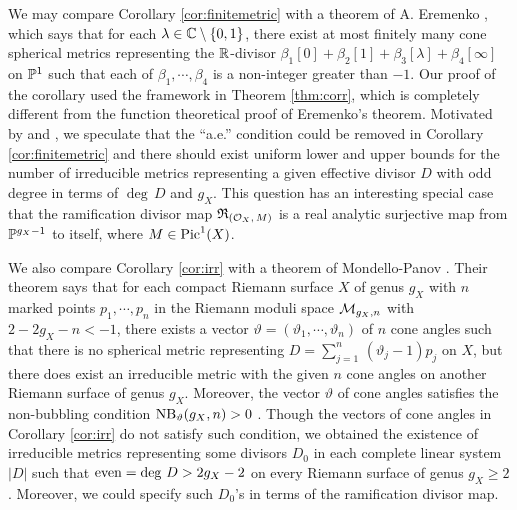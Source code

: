 \documentclass[12pt]{article}
\begin{document}
We may compare Corollary \ref{cor:finitemetric} with a theorem of A. Eremenko \cite{Er1905}, which says that for each $\lambda\in {\Bbb C} \setminus \{0,1\}$, there exist at most finitely many cone spherical metrics representing
the ${\Bbb R}$-divisor $\beta_1[0]+\beta_2[1]+\beta_3[\lambda]+\beta_4[\infty]$
on ${\Bbb P}^1$ such that each of $\beta_1,\cdots,\beta_4$  is a non-integer greater than $-1$.
Our proof of the corollary used the framework in Theorem \ref{thm:corr}, which is completely different from the function theoretical proof of Eremenko's theorem. Motivated by \cite[Theorem 1.5]{BdMM11} and \cite{CLWpre}, we speculate that the ``a.e.'' condition could be removed in Corollary \ref{cor:finitemetric} and there should exist uniform lower and upper bounds for the number of irreducible metrics representing a given effective divisor $D$ with odd degree in terms of $\deg\, D$ and $g_X$. This question has an interesting special case that the ramification divisor map ${\frak R}_{({\mathcal O}_X,\,M)}$ is a real analytic surjective map from ${\Bbb P}^{g_X-1}$ to itself, where $M\in {\rm Pic}^1(X)$.

We also compare Corollary \ref{cor:irr} with a theorem of Mondello-Panov \cite[Theorem D]{MP1807}. Their theorem says that for each compact Riemann surface $X$ of genus $g_{X}$ with $n$ marked points $p_1,\cdots, p_n$ in the Riemann moduli space ${\cal M}_{g_{X},n}$ with $2 - 2g_{X} - n < -1$, there exists a vector $\vartheta=(\vartheta_1,\cdots,\vartheta_n)$ of $n$ cone angles such that there is no spherical metric representing $D=\sum_{j=1}^n\,(\vartheta_j-1)p_j$ on $X$, but there does exist an irreducible metric with the given $n$ cone angles on another Riemann surface of genus $g_{X}$. Moreover, the vector $\vartheta$ of cone angles satisfies the non-bubbling condition ${\rm NB}_\vartheta (g_{X}, n) > 0$ \cite[Definition 1.5]{MP1807}.
Though the vectors of cone angles in Corollary \ref{cor:irr} do not satisfy such condition, we obtained the existence of irreducible metrics representing some divisors $D_0$ in each complete linear system $|D|$ such that ${\rm even}=\deg\, D > 2g_{X} - 2$ on every Riemann surface of genus $g_{X} \geq 2$. Moreover, we could specify such $D_0$'s in terms of the ramification divisor map.
\end{document}
